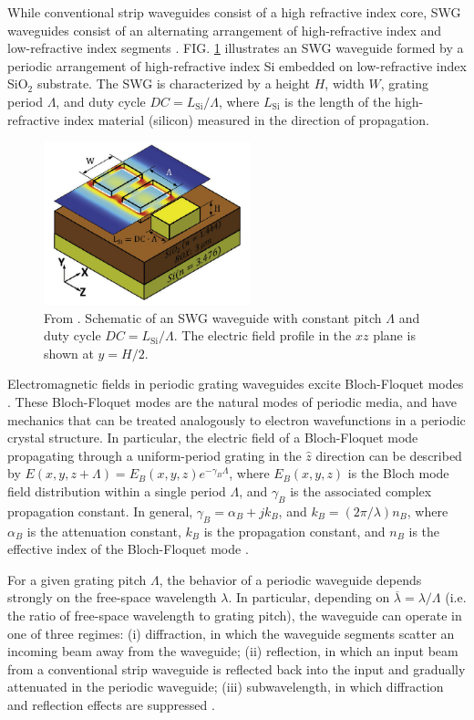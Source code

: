 \documentclass[aps,prl,twocolumn, superscriptaddress,nobalancelastpage]{revtex4}
\begin{document}
While conventional strip waveguides consist of a high refractive index core, SWG waveguides consist of an alternating arrangement of high-refractive index and low-refractive index segments \cite{OGswg}. FIG. \ref{fig:SWGdiagram} illustrates an SWG waveguide formed by a periodic arrangement of high-refractive index Si embedded on low-refractive index SiO$_2$ substrate. The SWG is characterized by a height $H$, width $W$, grating period $\Lambda$, and duty cycle $DC= L_\text{Si}/\Lambda$, where $L_\text{Si}$ is the length of the high-refractive index material (silicon) measured in the direction of propagation. 

\begin{figure}[!ht]
    \centering
    \includegraphics[width=6cm]{swgwaveguide2.png}
    \caption{From \cite{swg1}. Schematic of an SWG waveguide with constant pitch $\Lambda$ and duty cycle $DC = L_\text{Si}/\Lambda$. The electric field profile in the $xz$ plane is shown at $y = H/2$.}
    \label{fig:SWGdiagram}
\end{figure}

Electromagnetic fields in periodic grating waveguides excite Bloch-Floquet modes \cite{PhotonicCrystalsText}. These Bloch-Floquet modes are the natural modes of periodic media, and have mechanics that can be treated analogously to electron wavefunctions in a periodic crystal structure. In particular, the electric field of a Bloch-Floquet mode propagating through a uniform-period grating in the $\hat{z}$ direction can be described by $E(x,y,z+\Lambda) = E_B(x,y,z)e^{-\gamma_B\Lambda}$, where $E_B(x,y,z)$ is the Bloch mode field distribution within a single period $\Lambda$, and $\gamma_B$ is the associated complex propagation constant. In general, $\gamma_B = \alpha_B + jk_B$, and $k_B = (2\pi/\lambda)n_B$, where $\alpha_B$ is the attenuation constant, $k_B$ is the propagation constant, and $n_B$ is the effective index of the Bloch-Floquet mode \cite{HalirReview}. 


For a given grating pitch $\Lambda$, the behavior of a periodic waveguide depends strongly on the free-space wavelength $\lambda$. In particular, depending on $\overline{\lambda} = \lambda/\Lambda$ (i.e. the ratio of free-space wavelength to grating pitch), the waveguide can operate in one of three regimes: (i) diffraction, in which the waveguide segments scatter an incoming beam away from the waveguide; (ii) reflection, in which an input beam from a conventional strip waveguide is reflected back into the input and gradually attenuated in the periodic waveguide; (iii) subwavelength, in which diffraction and reflection effects are suppressed \cite{HalirReview}. 
\end{document}
